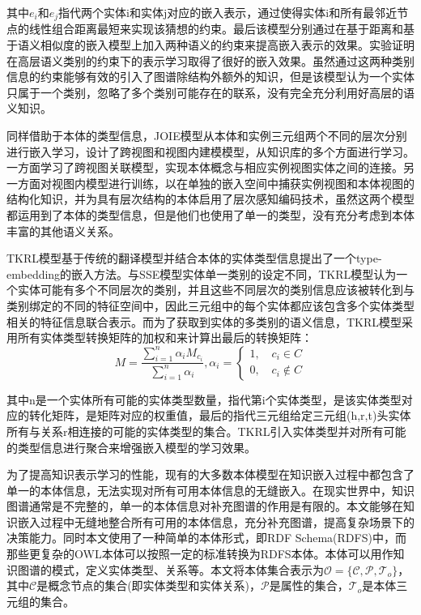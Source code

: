 其中\(e_{i}\)和\(e_{j}\)指代两个实体i和实体j对应的嵌入表示，通过使得实体i和所有最邻近节点的线性组合距离最短来实现该猜想的约束。最后该模型分别通过在基于距离和基于语义相似度的嵌入模型上加入两种语义的约束来提高嵌入表示的效果。实验证明在高层语义类别的约束下的表示学习取得了很好的嵌入效果。虽然通过这两种类别信息的约束能够有效的引入了图谱除结构外额外的知识，但是该模型认为一个实体只属于一个类别，忽略了多个类别可能存在的联系，没有完全充分利用好高层的语义知识。

同样借助于本体的类型信息，JOIE\cite{hao2019universal}模型从本体和实例三元组两个不同的层次分别进行嵌入学习，设计了跨视图和视图内建模模型，从知识库的多个方面进行学习。一方面学习了跨视图关联模型，实现本体概念与相应实例视图实体之间的连接。另一方面对视图内模型进行训练，以在单独的嵌入空间中捕获实例视图和本体视图的结构化知识，并为具有层次结构的本体启用了层次感知编码技术，虽然这两个模型都运用到了本体的类型信息，但是他们也使用了单一的类型，没有充分考虑到本体丰富的其他语义关系。

TKRL\cite{xie2016representation-TKRL}模型基于传统的翻译模型并结合本体的实体类型信息提出了一个type-embedding的嵌入方法。与SSE模型实体单一类别的设定不同，TKRL模型认为一个实体可能有多个不同层次的类别，并且这些不同层次的类别信息应该被转化到与类别绑定的不同的特征空间中，因此三元组中的每个实体都应该包含多个实体类型相关的特征信息联合表示。而为了获取到实体的多类别的语义信息，TKRL模型采用所有实体类型转换矩阵的加权和来计算出最后的转换矩阵：
\begin{equation}
  M = \frac{\sum^{n}_{i = 1}\alpha_{i}M_{c_{i}}}{\sum^{n}_{i = 1}\alpha_{i}}, \alpha_{i} = \left \{\begin{array}{ll}
    1,\quad c_{i} \in C\\
    0,\quad c_{i} \notin C
    \end{array} 
    \right.\label{eq:2-3}
\end{equation}

其中n是一个实体所有可能的实体类型数量，指代第i个实体类型，是该实体类型对应的转化矩阵，是矩阵对应的权重值，最后的指代三元组给定三元组(h,r,t)头实体所有与关系r相连接的可能的实体类型的集合。TKRL引入实体类型并对所有可能的类型信息进行聚合来增强嵌入模型的学习效果。

为了提高知识表示学习的性能，现有的大多数本体模型在知识嵌入过程中都包含了单一的本体信息，无法实现对所有可用本体信息的无缝嵌入。在现实世界中，知识图谱通常是不完整的，单一的本体信息对补充图谱的作用是有限的。本文能够在知识嵌入过程中无缝地整合所有可用的本体信息，充分补充图谱，提高复杂场景下的决策能力。同时本文使用了一种简单的本体形式，即RDF Schema(RDFS)中，而那些更复杂的OWL本体可以按照一定的标准转换为RDFS本体。本体可以用作知识图谱的模式，定义实体类型、关系等。本文将本体集合表示为\(\mathcal{O} = \{\mathcal{C}, \mathcal{P},\mathcal{T}_{o}\}\)，其中\(\mathcal{C}\)是概念节点的集合(即实体类型和实体关系)，\(\mathcal{P}\)是属性的集合，\(\mathcal{T}_{o}\)是本体三元组的集合。

